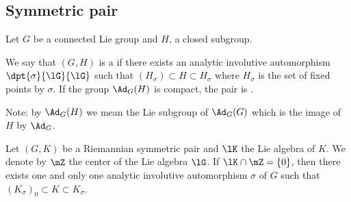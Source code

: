 \subsection{Symmetric pair}

Let $G$ be a connected Lie group and $H$, a closed subgroup.
\begin{definition}
We say that $(G,H)$ is a  if there exists an analytic involutive automorphism $\dpt{\sigma}{\lG}{\lG}$ such that $(H_{\sigma})\subset H\subset H_{\sigma}$
where $H_{\sigma}$ is the set of fixed points by $\sigma$. If the group $\Ad_G(H)$ is compact, the pair is .
\end{definition}
Note: by $\Ad_G(H)$ we mean the Lie subgroup of $\Ad_G(G)$ which is the image of $H$ by $\Ad_G$.


\begin{proposition}
Let $(G,K)$ be a Riemannian symmetric pair and $\lK$ the Lie algebra of $K$. We denote by $\mZ$ the center of the Lie algebra $\lG$. If $\lK\cap\mZ=\{0\}$, then there exists one and only one analytic involutive automorphism $\sigma$ of $G$ such that $(K_{\sigma})_0\subset K\subset K_{\sigma}$.
\end{proposition}

